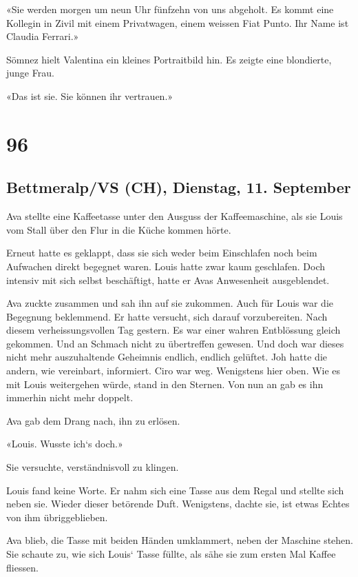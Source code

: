 «Sie werden morgen um neun Uhr fünfzehn von uns abgeholt. Es kommt eine
Kollegin in Zivil mit einem Privatwagen, einem weissen Fiat Punto. Ihr
Name ist Claudia Ferrari.»

Sömnez hielt Valentina ein kleines Portraitbild hin. Es zeigte eine
blondierte, junge Frau.

«Das ist sie. Sie können ihr vertrauen.»

\chapter{96}\label{section-96}

\section{Bettmeralp/VS (CH), Dienstag, 11.
September}\label{bettmeralpvs-ch-dienstag-11.-september-1}

Ava stellte eine Kaffeetasse unter den Ausguss der Kaffeemaschine, als
sie Louis vom Stall über den Flur in die Küche kommen hörte.

Erneut hatte es geklappt, dass sie sich weder beim Einschlafen noch beim
Aufwachen direkt begegnet waren. Louis hatte zwar kaum geschlafen. Doch
intensiv mit sich selbst beschäftigt, hatte er Avas Anwesenheit
ausgeblendet.

Ava zuckte zusammen und sah ihn auf sie zukommen. Auch für Louis war die
Begegnung beklemmend. Er hatte versucht, sich darauf vorzubereiten. Nach
diesem verheissungsvollen Tag gestern. Es war einer wahren Entblössung
gleich gekommen. Und an Schmach nicht zu übertreffen gewesen. Und doch
war dieses nicht mehr auszuhaltende Geheimnis endlich, endlich gelüftet.
Joh hatte die andern, wie vereinbart, informiert. Ciro war weg.
Wenigstens hier oben. Wie es mit Louis weitergehen würde, stand in den
Sternen. Von nun an gab es ihn immerhin nicht mehr doppelt.

Ava gab dem Drang nach, ihn zu erlösen.

«Louis. Wusste ich`s doch.»

Sie versuchte, verständnisvoll zu klingen.

Louis fand keine Worte. Er nahm sich eine Tasse aus dem Regal und
stellte sich neben sie. Wieder dieser betörende Duft. Wenigstens, dachte
sie, ist etwas Echtes von ihm übriggeblieben.

Ava blieb, die Tasse mit beiden Händen umklammert, neben der Maschine
stehen. Sie schaute zu, wie sich Louis` Tasse füllte, als sähe sie zum
ersten Mal Kaffee fliessen.

